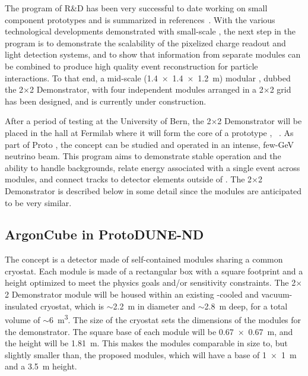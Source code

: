 The program of  R\&D has been very successful to date working on small component prototypes and is summarized in references~\cite{ Ereditato:2013xaa, Zeller:2013sva, art_cold_ero, Asaadi:2018oxk, Cavanna:2014iqa, larpix, bib:docdb10419, Auger:2017flc}. 
With the various technological developments demonstrated with small-scale , the next step in the  program is to demonstrate the scalability of the pixelized charge readout and light detection systems, and to show that information from separate modules can be combined to produce high quality event reconstruction for particle interactions. To that end, a mid-scale (\SI[product-units=repeat]{1.4x1.4x1.2}{\metre}) modular , dubbed the  2$\times$2 Demonstrator, with four independent  modules arranged in a 2$\times$2 grid has been designed, and is currently under construction. 

After a period of testing at the University of Bern, the  2$\times$2 Demonstrator will be placed in the    hall at Fermilab where it will form the core of a prototype   , ~\cite{protoND}.   As part of Proto , the  concept can be studied and operated in an intense, few-GeV neutrino beam.  This program aims to demonstrate stable operation and the ability to handle backgrounds, relate energy associated with a single event across  modules, and connect tracks to detector elements outside of .  The  2$\times$2 Demonstrator is described below in some detail since the    modules are anticipated to be very similar.


\subsection{ArgonCube in ProtoDUNE-ND}
\label{sec:2x2-design}


The   concept is a detector made of self-contained  modules sharing a common cryostat. Each module is made of a rectangular box with a square footprint and a height optimized to meet the physics goals and/or sensitivity constraints. The  2$\times$2 Demonstrator module will be housed within an existing \lntwo-cooled and vacuum-insulated cryostat, 
which is $\sim$\SI{2.2}{\metre} in diameter and $\sim$\SI{2.8}{\metre} deep, for a total volume of $\sim$\SI{6}{\metre\cubed}. The size of the cryostat sets the dimensions of the modules for the demonstrator. The square base of each module will be \SI{0.67 x 0.67}{\metre}, and the height will be \SI{1.81}{\metre}. This makes the modules comparable in size to, but slightly smaller than, the proposed     modules, which will have a base of \SI{1 x 1}{\metre} and a \SI{3.5}{\metre} height.

